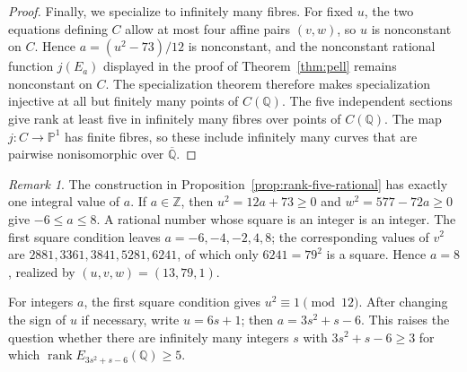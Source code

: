 \documentclass[draft]{publmathdeb}
\theoremstyle{remark}
\newtheorem{remark}[theorem]{Remark}
\numberwithin{equation}{section}
\newcommand{\Q}{\mathbb Q}
\newcommand{\Z}{\mathbb Z}
\DeclareMathOperator{\rank}{rank}
\begin{document}
\begin{proof}
  Finally, we specialize to infinitely many fibres. For fixed $u$, the two equations defining $C$ allow at most four affine pairs $(v,w)$, so $u$ is nonconstant on $C$. Hence $a=(u^2-73)/12$ is nonconstant, and the nonconstant rational function $j(E_a)$ displayed in the proof of Theorem~\ref{thm:pell} remains nonconstant on $C$. The specialization theorem \cite[Theorem C.20.3]{Silverman2009} therefore makes specialization injective at all but finitely many points of $C(\Q)$. The five independent sections give rank at least five in infinitely many fibres over points of $C(\Q)$. The map $j:C\to\mathbb P^1$ has finite fibres, so these include infinitely many curves that are pairwise nonisomorphic over $\overline{\Q}$.
\end{proof}

\begin{remark}\label{rem:rank-five-integrality}
  The construction in Proposition~\ref{prop:rank-five-rational} has exactly one integral value of $a$. If $a\in\Z$, then $u^2=12a+73\geq0$ and $w^2=577-72a\geq0$ give $-6\leq a\leq8$. A rational number whose square is an integer is an integer. The first square condition leaves $a=-6,-4,-2,4,8$; the corresponding values of $v^2$ are $2881,3361,3841,5281,6241$, of which only $6241=79^2$ is a square. Hence $a=8$, realized by $(u,v,w)=(13,79,1)$.
\end{remark}

For integers $a$, the first square condition gives $u^2\equiv1\pmod{12}$. After changing the sign of $u$ if necessary, write $u=6s+1$; then $a=3s^2+s-6$. This raises the question whether there are infinitely many integers $s$ with $3s^2+s-6\geq3$ for which $\rank E_{3s^2+s-6}(\Q)\geq5$.






\begingroup
\raggedright

\endgroup
\end{document}
